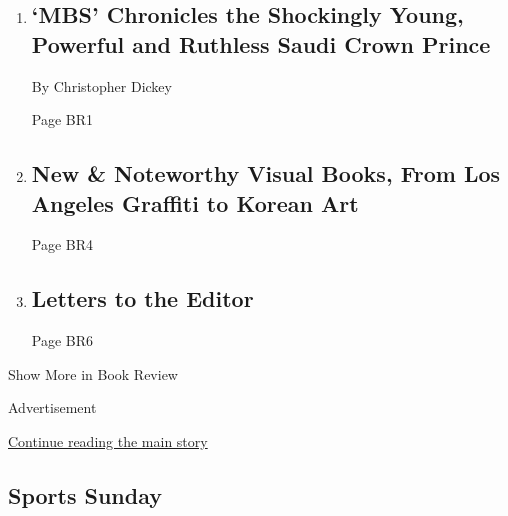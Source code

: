 \begin{enumerate}
\def\labelenumi{\arabic{enumi}.}
\item
  \href{/2020/03/09/books/review/mbs-the-rise-to-power-of-mohammed-bin-salman-ben-hubbard.html}{}

  \hypertarget{mbs-chronicles-the-shockingly-young-powerful-and-ruthless-saudi-crown-prince}{%
  \subsection{`MBS' Chronicles the Shockingly Young, Powerful and
  Ruthless Saudi Crown
  Prince}\label{mbs-chronicles-the-shockingly-young-powerful-and-ruthless-saudi-crown-prince}}

  By Christopher Dickey

  Page BR1
\item
  \href{/2020/03/24/books/review/new-this-week.html}{}

  \hypertarget{new--noteworthy-visual-books-from-los-angeles-graffiti-to-korean-art}{%
  \subsection{New \& Noteworthy Visual Books, From Los Angeles Graffiti
  to Korean
  Art}\label{new--noteworthy-visual-books-from-los-angeles-graffiti-to-korean-art}}

  Page BR4
\item
  \href{/2020/03/27/books/review/letters-to-the-editor.html}{}

  \hypertarget{letters-to-the-editor}{%
  \subsection{Letters to the Editor}\label{letters-to-the-editor}}

  Page BR6
\end{enumerate}

Show More in Book Review

Advertisement

\protect\hyperlink{after-mid6}{Continue reading the main story}

\hypertarget{sports-sunday}{%
\subsection{Sports Sunday}\label{sports-sunday}}

